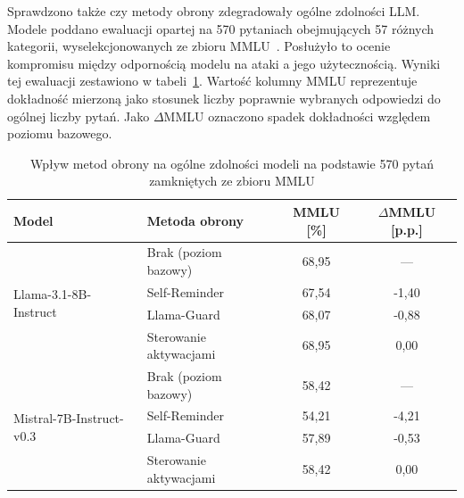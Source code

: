 Sprawdzono także czy metody obrony zdegradowały ogólne zdolności \gls{LLM}. Modele poddano ewaluacji opartej na 570 pytaniach obejmujących 57 różnych kategorii, wyselekcjonowanych ze zbioru MMLU~\cite{hendrycks2021measuringmassivemultitasklanguage}. Posłużyło to ocenie kompromisu między odpornością modelu na ataki a jego użytecznością. Wyniki tej ewaluacji zestawiono w tabeli~\ref{tab:mmlu}. Wartość kolumny MMLU reprezentuje dokładność mierzoną jako stosunek liczby poprawnie wybranych odpowiedzi do ogólnej liczby pytań. Jako $\Delta$MMLU oznaczono spadek dokładności względem poziomu bazowego.
\begin{table}[!ht]
    \centering
    \renewcommand{\arraystretch}{1.2}
    \begin{tabular}{l|l|c|c}
        \hline
        \textbf{Model} & \textbf{Metoda obrony} & \textbf{MMLU [\%]} & \textbf{$\Delta$MMLU [p.p.]} \\\hline
        \multirow{4}{*}{Llama-3.1-8B-Instruct}
                       & Brak (poziom bazowy)   & 68,95              & ---                          \\\cline{2-4}
                       & Self-Reminder          & 67,54              & -1,40                        \\\cline{2-4}
                       & Llama-Guard            & 68,07              & -0,88                        \\\cline{2-4}
                       & Sterowanie aktywacjami & 68,95              & 0,00                         \\\hline
        \multirow{4}{*}{Mistral-7B-Instruct-v0.3}
                       & Brak (poziom bazowy)   & 58,42              & ---                          \\\cline{2-4}
                       & Self-Reminder          & 54,21              & -4,21                        \\\cline{2-4}
                       & Llama-Guard            & 57,89              & -0,53                        \\\cline{2-4}
                       & Sterowanie aktywacjami & 58,42              & 0,00                         \\\hline
    \end{tabular}
    \caption{Wpływ metod obrony na ogólne zdolności modeli na podstawie 570 pytań zamkniętych ze zbioru MMLU}
    \label{tab:mmlu}
\end{table}
